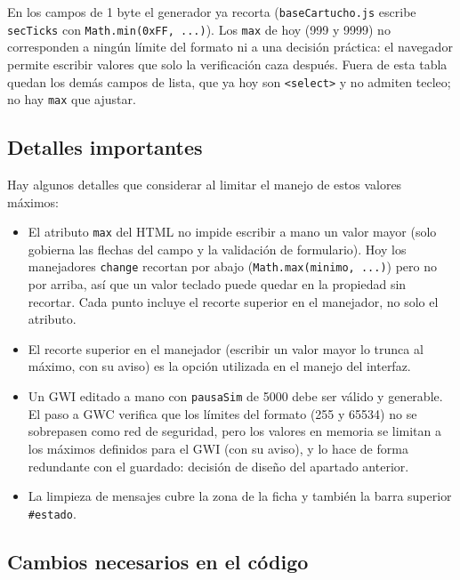 En los campos de 1 byte el generador ya recorta (\texttt{baseCartucho.js} escribe \texttt{secTicks} con \texttt{Math.min(0xFF, ...)}). Los \texttt{max} de hoy (999 y 9999) no corresponden a ningún límite del formato ni a una decisión práctica: el navegador permite escribir valores que solo la verificación caza después. Fuera de esta tabla quedan los demás campos de lista, que ya hoy son \texttt{<select>} y no admiten tecleo; no hay \texttt{max} que ajustar.

\subsection{Detalles importantes}
\label{sec:F5I16Detalles}

Hay algunos detalles que considerar al limitar el manejo de estos valores máximos:

\begin{itemize}
	\item El atributo \texttt{max} del HTML no impide escribir a mano un valor mayor (solo gobierna las flechas del campo y la validación de formulario). Hoy los manejadores \texttt{change} recortan por abajo (\texttt{Math.max(minimo, ...)}) pero no por arriba, así que un valor teclado puede quedar en la propiedad sin recortar. Cada punto incluye el recorte superior en el manejador, no solo el atributo.
	\item El recorte superior en el manejador (escribir un valor mayor lo trunca al máximo, con su aviso) es la opción utilizada en el manejo del interfaz.
	\item Un GWI editado a mano con \texttt{pausaSim} de 5000 debe ser válido y generable. El paso a GWC verifica que los límites del formato (255 y 65534) no se sobrepasen como red de seguridad, pero los valores en memoria se limitan a los máximos definidos para el GWI (con su aviso), y lo hace de forma redundante con el guardado: decisión de diseño del apartado anterior.
	\item La limpieza de mensajes cubre la zona de la ficha y también la barra superior \texttt{\#estado}.
\end{itemize}

\subsection{Cambios necesarios en el código}
\label{sec:F5I16Codigo}


